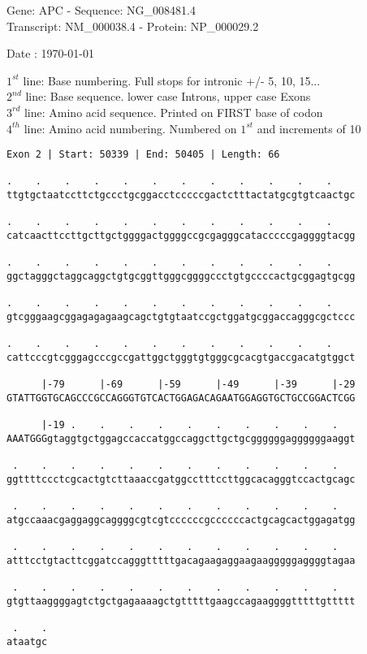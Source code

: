 \documentclass{article}
\begin{document}
\begin{center}
\begin{large}
Gene: APC - Sequence: NG\_008481.4\\
Transcript: NM\_000038.4 - Protein: NP\_000029.2
 
 Date : \today
\end{large}
\end{center}
$1^{st}$ line: Base numbering. Full stops for intronic +/- 5, 10, 15...\\
$2^{nd}$ line: Base sequence. lower case Introns, upper case Exons\\
$3^{rd}$ line: Amino acid sequence. Printed on FIRST base of codon\\
$4^{th}$ line: Amino acid numbering. Numbered on $1^{st}$ and increments of 10\\
\begin{Verbatim}[fontfamily=courier]
Exon 2 | Start: 50339 | End: 50405 | Length: 66

.    .    .    .    .    .    .    .    .    .    .    .    
ttgtgctaatccttctgccctgcggacctcccccgactctttactatgcgtgtcaactgc

.    .    .    .    .    .    .    .    .    .    .    .    
catcaacttccttgcttgctggggactggggccgcgagggcatacccccgaggggtacgg

.    .    .    .    .    .    .    .    .    .    .    .    
ggctagggctaggcaggctgtgcggttgggcggggccctgtgccccactgcggagtgcgg

.    .    .    .    .    .    .    .    .    .    .    .    
gtcgggaagcggagagagaagcagctgtgtaatccgctggatgcggaccagggcgctccc

.    .    .    .    .    .    .    .    .    .    .    .    
cattcccgtcgggagcccgccgattggctgggtgtgggcgcacgtgaccgacatgtggct

      |-79      |-69      |-59      |-49      |-39      |-29
GTATTGGTGCAGCCCGCCAGGGTGTCACTGGAGACAGAATGGAGGTGCTGCCGGACTCGG

      |-19 .    .    .    .    .    .    .    .    .    .   
AAATGGGgtaggtgctggagccaccatggccaggcttgctgcggggggaggggggaaggt

 .    .    .    .    .    .    .    .    .    .    .    .   
ggttttccctcgcactgtcttaaaccgatggcctttccttggcacagggtccactgcagc

 .    .    .    .    .    .    .    .    .    .    .    .   
atgccaaacgaggaggcaggggcgtcgtccccccgccccccactgcagcactggagatgg

 .    .    .    .    .    .    .    .    .    .    .    .   
atttcctgtacttcggatccagggtttttgacagaagaggaagaagggggaggggtagaa

 .    .    .    .    .    .    .    .    .    .    .    .   
gtgttaaggggagtctgctgagaaaagctgtttttgaagccagaaggggtttttgttttt

 .    .
ataatgc
\end{Verbatim}
\end{document}
